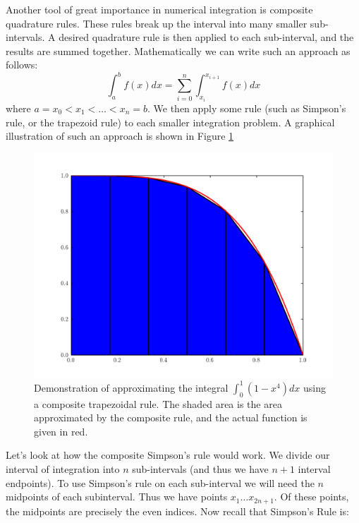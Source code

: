 Another tool of great importance in numerical integration is composite quadrature rules.
These rules break up the interval into many smaller sub-intervals.
A desired quadrature rule is then applied to each sub-interval, and the results are summed together.
Mathematically we can write such an approach as follows:
\[
\int_a^b f(x) dx = \sum_{i=0}^n \int_{x_i}^{x_{i+1}} f(x) dx
\]
where $a = x_0 < x_1 < \ldots < x_n = b$.
We then apply some rule (such as Simpson's rule, or the trapezoid rule) to each smaller integration problem.
A graphical illustration of such an approach is shown in Figure \ref{Fig:TrapezoidalComposite}

\begin{figure}
\begin{center}
\includegraphics[width=\textwidth]{TrapezoidComp.pdf}
\caption{Demonstration of approximating the integral $\int_0^1 (1-x^4)dx$ using a composite trapezoidal rule.
The shaded area is the area approximated by the composite rule, and the actual function is given in red.}
\label{Fig:TrapezoidalComposite}
\end{center}
\end{figure}

Let's look at how the composite Simpson's rule would work.
We divide our interval of integration into $n$ sub-intervals (and thus we have $n+1$ interval endpoints).
To use Simpson's rule on each sub-interval we will need the $n$ midpoints of each subinterval.
Thus we have points $x_1 \ldots x_{2n+1}$.
Of these points, the midpoints are precisely the even indices.
Now recall that Simpson's Rule is:

